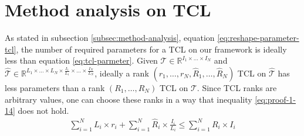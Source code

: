 \documentclass{article}
\begin{document}
\section{Method analysis on TCL}
\label{proof-1}
As stated in subsection \ref{subsec:method-analysis}, 
equation \ref{eq:reshape-parameter-tcl}, the number of required parameters for a TCL on our framework is ideally less than equation \ref{eq:tcl-parmeter}. Given $\mathcal{T} \in \mathbb{R}^{I_1\times\dots\times I_N}$ and $\hat{\mathcal{T}} \in \mathbb{R}^{L_1\times\dots\times L_N\times \frac{I_1}{L_1}\times\dots\times\frac{I_N}{L_N}}$, ideally a rank $(r_1,\dots,r_N, \hat{R}_1, \dots, \hat{R}_N)$ TCL on $\hat{\mathcal{T}}$ has less parameters than a rank $(R_1,\dots,R_N)$ TCL on $\mathcal{T}$. Since TCL ranks are arbitrary values, one can choose these ranks in a way that inequality \ref{eq:proof-1-14} does not hold.
\begin{align}
	\label{eq:proof-1-14}
	\sum_{i=1}^{N}L_i\times r_i + \sum_{i=1}^{N} \hat{R}_i \times \frac{I_i}{L_i} \leq
	\sum_{i=1}^{N}R_i\times I_i
\end{align}
\end{document}
